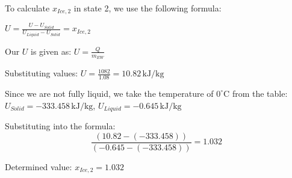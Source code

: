 To calculate \( x_{Ice,2} \) in state 2, we use the following formula:  

\( U = \frac{U - U_{Solid}}{U_{Liquid} - U_{Solid}} = x_{Ice,2} \)  

Our \( U \) is given as:  
\( U = \frac{Q}{m_{EW}} \)  

Substituting values:  
\( U = \frac{1082}{1.08} = 10.82 \, \text{kJ/kg} \)  

Since we are not fully liquid, we take the temperature of \( 0^\circ \text{C} \) from the table:  
\( U_{Solid} = -333.458 \, \text{kJ/kg} \), \( U_{Liquid} = -0.645 \, \text{kJ/kg} \)  

Substituting into the formula:  
\[
\frac{(10.82 - (-333.458))}{(-0.645 - (-333.458))} = 1.032
\]  

Determined value:  
\( x_{Ice,2} = 1.032 \)